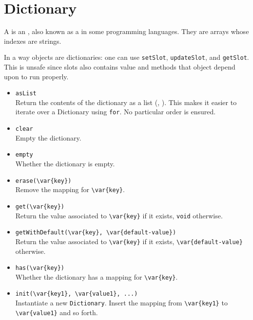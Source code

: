 \section{Dictionary}

A  is an , also known as a
 in some programming languages.  They are arrays whose
indexes are strings.

In a way objects are dictionaries: one can use \lstinline|setSlot|,
\lstinline|updateSlot|, and \lstinline|getSlot|.  This is unsafe since
slots also contains value and methods that object depend upon to run
properly.

\begin{itemize}
\item \lstinline|asList|\\
  Return the contents of the dictionary as a  list
  (, ).  This makes it easier to iterate over a
  Dictionary using \lstinline|for|.  No particular order is ensured.

\item \lstinline|clear|\\
  Empty the dictionary.

\item \lstinline|empty|\\
  Whether the dictionary is empty.

\item \lstinline|erase(\var{key})|\\
  Remove the mapping for \lstinline|\var{key}|.

\item \lstinline|get(\var{key})|\\
  Return the value associated to  \lstinline|\var{key}| if it exists,
  \lstinline|void| otherwise.

\item \lstinline|getWithDefault(\var{key}, \var{default-value})|\\
  Return the value associated to  \lstinline|\var{key}| if it exists,
  \lstinline|\var{default-value}| otherwise.

\item \lstinline|has(\var{key})|\\
  Whether the dictionary has a mapping for \lstinline|\var{key}|.

\item \lstinline|init(\var{key1}, \var{value1}, ...)|~\\
  Instantiate a new \lstinline|Dictionary|.  Insert the mapping from
  \lstinline|\var{key1}| to \lstinline|\var{value1}| and so forth.


\end{itemize}
